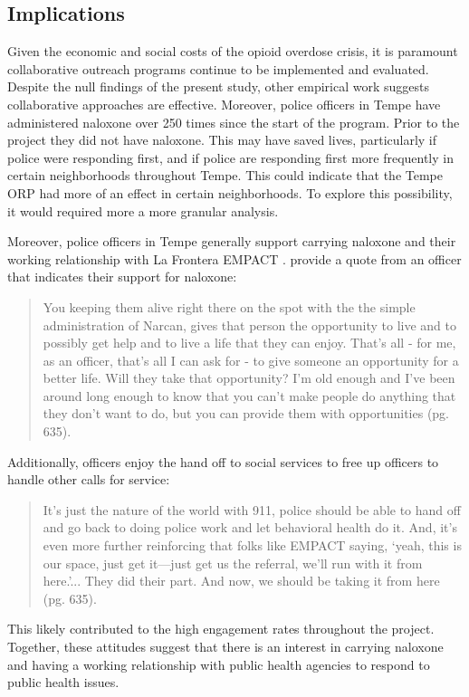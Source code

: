 \subsection{Implications}
Given the economic and social costs of the opioid overdose crisis, it is paramount collaborative outreach programs continue to be implemented and evaluated. Despite the null findings of the present study, other empirical work suggests collaborative approaches are effective. Moreover, police officers in Tempe have administered naloxone over 250 times since the start of the program. Prior to the project they did not have naloxone. This may have saved lives, particularly if police were responding first, and if police are responding first more frequently in certain neighborhoods throughout Tempe. This could indicate that the Tempe ORP had more of an effect in certain neighborhoods. To explore this possibility, it would required more a more granular analysis. 

Moreover, police officers in Tempe generally support carrying naloxone and their working relationship with La Frontera EMPACT \parencite{white_narcan_2021, white_moving_2021}. \textcite{white_moving_2021} provide a quote from an officer that indicates their support for naloxone:
\begin{quote}
You keeping them alive right there on the spot with the the simple administration of Narcan, gives that person the opportunity to live and to possibly get help and to live a life that they can enjoy. That’s all - for me, as an officer, that’s all I can ask for - to give someone an opportunity for a better life. Will they take that opportunity? I’m old enough and I’ve been around long enough to know that you can’t make people do anything that they don’t want to do, but you can provide them with opportunities (pg. 635).
\end{quote}

\noindent Additionally, officers enjoy the hand off to social services to free up officers to handle other calls for service:
\begin{quote}
It’s just the nature of the world with 911, police should be able to hand off and
go back to doing police work and let behavioral health do it. And, it’s even
more further reinforcing that folks like EMPACT saying, ‘yeah, this is our
space, just get it—just get us the referral, we’ll run with it from here.’... They
did their part. And now, we should be taking it from here (pg. 635).
\end{quote}
\noindent This likely contributed to the high engagement rates throughout the project. Together, these attitudes suggest that there is an interest in carrying naloxone and having a working relationship with public health agencies to respond to public health issues.

